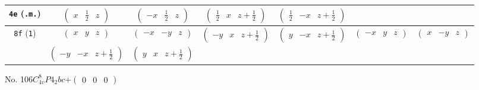\documentclass[fleqn,9pt,landscape]{jsarticle}
\begin{document}
\begin{center}
\begin{longtable}{ccccccc}
{\tt 4e} ({\tt .m.}) & $ \begin{pmatrix} x & \frac{1}{2} & z \end{pmatrix} $ & $ \begin{pmatrix} - x & \frac{1}{2} & z \end{pmatrix} $ & $ \begin{pmatrix} \frac{1}{2} & x & z + \frac{1}{2} \end{pmatrix} $ & $ \begin{pmatrix} \frac{1}{2} & - x & z + \frac{1}{2} \end{pmatrix} $ & $  $ & $  $ \\ \hline
{\tt 8f} ({\tt 1}) & $ \begin{pmatrix} x & y & z \end{pmatrix} $ & $ \begin{pmatrix} - x & - y & z \end{pmatrix} $ & $ \begin{pmatrix} - y & x & z + \frac{1}{2} \end{pmatrix} $ & $ \begin{pmatrix} y & - x & z + \frac{1}{2} \end{pmatrix} $ & $ \begin{pmatrix} - x & y & z \end{pmatrix} $ & $ \begin{pmatrix} x & - y & z \end{pmatrix} $ \\
& $ \begin{pmatrix} - y & - x & z + \frac{1}{2} \end{pmatrix} $ & $ \begin{pmatrix} y & x & z + \frac{1}{2} \end{pmatrix} $ & $  $ & $  $ & $  $ & $  $ \\
\end{longtable}
\end{center}
\newpage
No. 106\quad$C_{4v}^{8}$\quad$P4_2bc$\quad[ tetragonal ]\quad$+\begin{pmatrix} 0 & 0 & 0 \end{pmatrix}$
\end{document}
